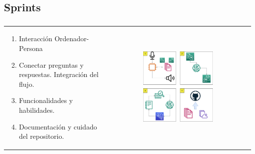 \subsection{Sprints}
\begin{frame}
  \frametitle{\insertsectionhead}
  \framesubtitle{\insertsubsectionhead}
  \begin{table}[H]
  	\begin{tabular}{lc}
  		\begin{minipage}{0.4\textwidth}
  			\begin{enumerate}
  				\item Interacción Ordenador-Persona
  				\item Conectar preguntas y respuestas. Integración del flujo.
  				\item Funcionalidades y habilidades. \cite{rasa}
  				\item Documentación y cuidado del repositorio.
  			\end{enumerate}
  		\end{minipage}
  		& \begin{minipage}{0.55\textwidth}
  			\begin{figure}[H]
  				\includegraphics[width=0.7\textwidth]{images/Sprints.png} 
  			\end{figure}
  		\end{minipage} \\
  	\end{tabular}
  \end{table}
\end{frame}


